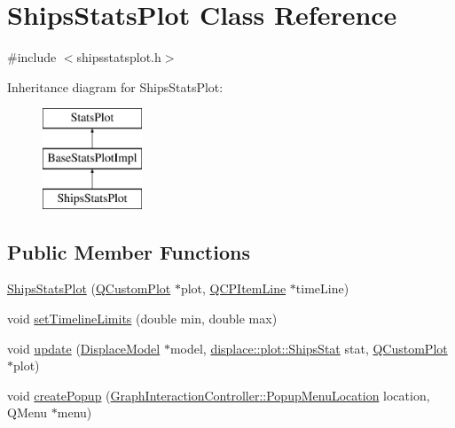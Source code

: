 \hypertarget{class_ships_stats_plot}{}\section{Ships\+Stats\+Plot Class Reference}
\label{class_ships_stats_plot}


{\ttfamily \#include $<$shipsstatsplot.\+h$>$}

Inheritance diagram for Ships\+Stats\+Plot\+:\begin{figure}[H]
\begin{center}
\leavevmode
\includegraphics[height=3.000000cm]{d3/d5a/class_ships_stats_plot}
\end{center}
\end{figure}
\subsection*{Public Member Functions}
\begin{DoxyCompactItemize}
\item 
\mbox{\hyperlink{class_ships_stats_plot_a8d1f07e750913ab4b9b7ed9ad742e700}{Ships\+Stats\+Plot}} (\mbox{\hyperlink{class_q_custom_plot}{Q\+Custom\+Plot}} $\ast$plot, \mbox{\hyperlink{class_q_c_p_item_line}{Q\+C\+P\+Item\+Line}} $\ast$time\+Line)
\item 
void \mbox{\hyperlink{class_ships_stats_plot_a7892421b2d2b67fd741e6b4bb8462380}{set\+Timeline\+Limits}} (double min, double max)
\item 
void \mbox{\hyperlink{class_ships_stats_plot_a0d69f5c81e3c90a47f93a6ae04a64418}{update}} (\mbox{\hyperlink{class_displace_model}{Displace\+Model}} $\ast$model, \mbox{\hyperlink{namespacedisplace_1_1plot_a8c50b4d54cafba744b1b5b51b53407e0}{displace\+::plot\+::\+Ships\+Stat}} stat, \mbox{\hyperlink{class_q_custom_plot}{Q\+Custom\+Plot}} $\ast$plot)
\item 
void \mbox{\hyperlink{class_ships_stats_plot_a466616522ee3eb4623479fcd1f844a85}{create\+Popup}} (\mbox{\hyperlink{class_graph_interaction_controller_a67e6eba082927bf2b984bed54fe32764}{Graph\+Interaction\+Controller\+::\+Popup\+Menu\+Location}} location, Q\+Menu $\ast$menu)
\end{DoxyCompactItemize}
